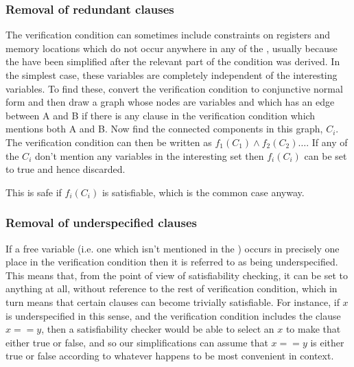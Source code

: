 
\subsubsection{Removal of redundant clauses}
The verification condition can sometimes include constraints on registers and memory locations which do not occur anywhere in any of the \StateMachines, usually because the \StateMachines have been simplified after the relevant part of the condition was derived.
In the simplest case, these variables are completely independent of the interesting variables.
To find these, convert the verification condition to conjunctive normal form and then draw a graph whose nodes are variables and which has an edge between A and B if there is any clause in the verification condition which mentions both A and B.
Now find the connected components in this graph, $C_i$.
The verification condition can then be written as $f_1(C_1) \wedge f_2(C_2) \ldots$.
If any of the $C_i$ don't mention any variables in the interesting set then $f_i(C_i)$ can be set to true and hence discarded.

This is safe if $f_i(C_i)$ is satisfiable, which is the common case anyway.

\subsubsection{Removal of underspecified clauses}

If a free variable (i.e. one which isn't mentioned in the \StateMachines) occurs in precisely one place in the verification condition then it is referred to as being underspecified.
This means that, from the point of view of satisfiability checking, it can be set to anything at all, without reference to the rest of verification condition, which in turn means that certain clauses can become trivially satisfiable.
For instance, if $x$ is underspecified in this sense, and the verification condition includes the clause $x == y$, then a satisfiability checker would be able to select an $x$ to make that either true or false, and so our simplifications can assume that $x == y$ is either true or false according to whatever happens to be most convenient in context.

